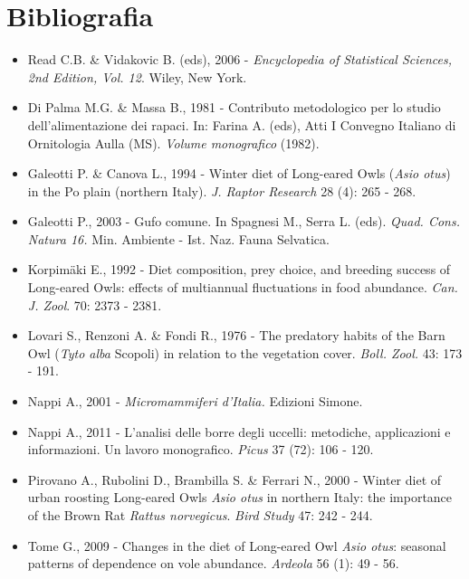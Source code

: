 \section*{Bibliografia}
\begin{itemize}\itemsep0pt
	\item Read C.B. \& Vidakovic B. (eds), 2006 - \textit{Encyclopedia of
Statistical Sciences, 2nd Edition, Vol. 12}. Wiley, New York.

	\item Di Palma M.G. \& Massa B., 1981 - Contributo metodologico per lo studio
dell{\textquoteright}alimentazione dei rapaci. In: Farina A. (eds),
Atti I Convegno Italiano di Ornitologia Aulla (MS). \textit{Volume
monografico }(1982). 

	\item Galeotti P. \& Canova L., 1994 - Winter diet of Long-eared Owls
(\textit{Asio otus}) in the Po plain (northern Italy). \textit{J.
Raptor Research }28 (4): 265 - 268.

	\item Galeotti P., 2003 - Gufo comune. In Spagnesi M., Serra L. (eds).
\textit{Quad. Cons. Natura 16. }Min. Ambiente - Ist. Naz. Fauna
Selvatica.

	\item Korpim\"aki E., 1992 - Diet composition, prey choice, and breeding
success of Long-eared Owls: effects of multiannual fluctuations in food
abundance. \textit{Can. J. Zool}. 70: 2373 - 2381.

	\item Lovari S., Renzoni A. \& Fondi R., 1976 - The predatory habits of the
Barn Owl (\textit{Tyto alba }Scopoli) in relation to the vegetation
cover. \textit{Boll. Zool. }43: 173 - 191.

	\item Nappi A., 2001 - \textit{Micromammiferi d{\textquoteright}Italia.
}Edizioni Simone.

	\item Nappi A., 2011 - L{\textquoteright}analisi delle borre degli uccelli:
metodiche, applicazioni e informazioni. Un lavoro monografico.
\textit{Picus }37 (72): 106 - 120. 

	\item Pirovano A., Rubolini D., Brambilla S. \& Ferrari N., 2000 - Winter diet
of urban roosting Long-eared Owls \textit{Asio otus} in northern Italy:
the importance of the Brown Rat \textit{Rattus norvegicus}.
\textit{Bird Study }47: 242 - 244.

	\item Tome G., 2009 - Changes in the diet of Long-eared Owl \textit{Asio
otus}: seasonal patterns of dependence on vole abundance.
\textit{Ardeola }56 (1): 49 - 56. 
\end{itemize}


